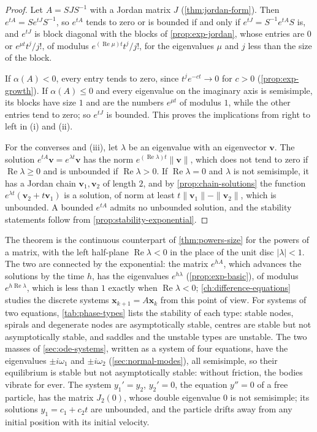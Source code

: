 \begin{proof}
Let $A=SJS^{-1}$ with a Jordan matrix $J$ (\cref{thm:jordan-form}). Then $e^{tA}=Se^{tJ}S^{-1}$, so $e^{tA}$ tends to zero or is bounded if and only if $e^{tJ}=S^{-1}e^{tA}S$ is, and $e^{tJ}$ is block diagonal with the blocks of \cref{prop:exp-jordan}, whose entries are $0$ or $e^{\mu t}t^j/j!$, of modulus $e^{(\operatorname{Re}\mu)t}t^j/j!$, for the eigenvalues $\mu$ and $j$ less than the size of the block.

If $\alpha(A)<0$, every entry tends to zero, since $t^je^{-ct}\to0$ for $c>0$ (\cref{prop:exp-growth}). If $\alpha(A)\le0$ and every eigenvalue on the imaginary axis is semisimple, its blocks have size $1$ and are the numbers $e^{\mu t}$ of modulus $1$, while the other entries tend to zero; so $e^{tJ}$ is bounded. This proves the implications from right to left in (i) and (ii).

For the converses and (iii), let $\lambda$ be an eigenvalue with an eigenvector $\mathbf v$. The solution $e^{tA}\mathbf v=e^{\lambda t}\mathbf v$ has the norm $e^{(\operatorname{Re}\lambda)t}\|\mathbf v\|$, which does not tend to zero if $\operatorname{Re}\lambda\ge0$ and is unbounded if $\operatorname{Re}\lambda>0$. If $\operatorname{Re}\lambda=0$ and $\lambda$ is not semisimple, it has a Jordan chain $\mathbf v_1,\mathbf v_2$ of length $2$, and by \cref{prop:chain-solutions} the function $e^{\lambda t}(\mathbf v_2+t\mathbf v_1)$ is a solution, of norm at least $t\|\mathbf v_1\|-\|\mathbf v_2\|$, which is unbounded. A bounded $e^{tA}$ admits no unbounded solution, and the stability statements follow from \cref{prop:stability-exponential}.
\end{proof}

The theorem is the continuous counterpart of \cref{thm:powers-size} for the powers of a matrix, with the left half-plane $\operatorname{Re}\lambda<0$ in the place of the unit disc $|\lambda|<1$. The two are connected by the exponential: the matrix $e^{hA}$, which advances the solutions by the time $h$, has the eigenvalues $e^{h\lambda}$ (\cref{prop:exp-basic}), of modulus $e^{h\operatorname{Re}\lambda}$, which is less than $1$ exactly when $\operatorname{Re}\lambda<0$; \cref{ch:difference-equations} studies the discrete systems $\mathbf x_{k+1}=A\mathbf x_k$ from this point of view. For systems of two equations, \cref{tab:phase-types} lists the stability of each type: stable nodes, spirals and degenerate nodes are asymptotically stable, centres are stable but not asymptotically stable, and saddles and the unstable types are unstable. The two masses of \cref{sec:ode-systems}, written as a system of four equations, have the eigenvalues $\pm i\omega_1$ and $\pm i\omega_2$ (\cref{sec:normal-modes}), all semisimple, so their equilibrium is stable but not asymptotically stable: without friction, the bodies vibrate for ever. The system $y_1'=y_2$, $y_2'=0$, the equation $y''=0$ of a free particle, has the matrix $J_2(0)$, whose double eigenvalue $0$ is not semisimple; its solutions $y_1=c_1+c_2t$ are unbounded, and the particle drifts away from any initial position with its initial velocity.

